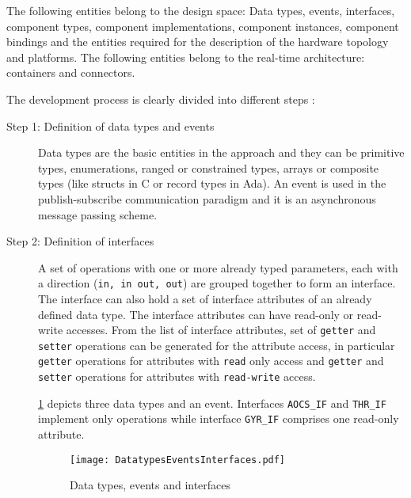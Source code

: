 The following entities belong to the design space: Data types, events, interfaces, component types, component implementations, component instances, component bindings and the entities required for the description of the hardware topology and platforms. The following entities belong to the real-time architecture: containers and connectors.

The development process is clearly divided into different steps \cite{CompBasedProcess}\cite{PhdThesis}\cite{SAVOIR}:

\begin{description}
\item [Step 1: Definition of data types and events] Data types are the basic entities in the approach and they can be primitive types, enumerations, ranged or constrained types, arrays or composite types (like structs in C or record types in Ada). An event is used in the publish-subscribe communication paradigm and it is an asynchronous message passing scheme. 

\item [Step 2: Definition of interfaces] A set of operations with one or more already typed parameters, each with a direction (\texttt{in, in out, out}) are grouped together to form an interface. The interface can also hold a set of interface attributes of an already defined data type. The interface attributes can have read-only or read-write accesses. From the list of interface attributes, set of \texttt{getter} and \texttt{setter} operations can be generated for the attribute access, in particular \texttt{getter} operations for attributes with \texttt{read} only access and \texttt{getter} and \texttt{setter} operations for attributes with \texttt{read-write} access. 

\cref{fig: Datatypes events and interfaces} depicts three data types and an event. Interfaces \texttt{AOCS\_IF} and \texttt{THR\_IF} implement only operations while interface \texttt{GYR\_IF} comprises one read-only attribute.

\begin{figure}[h]
	\centering
	\texttt{[image: DatatypesEventsInterfaces.pdf]}
	\caption{Data types, events and interfaces}
	\label{fig: Datatypes events and interfaces}
\end{figure}


\end{description}
